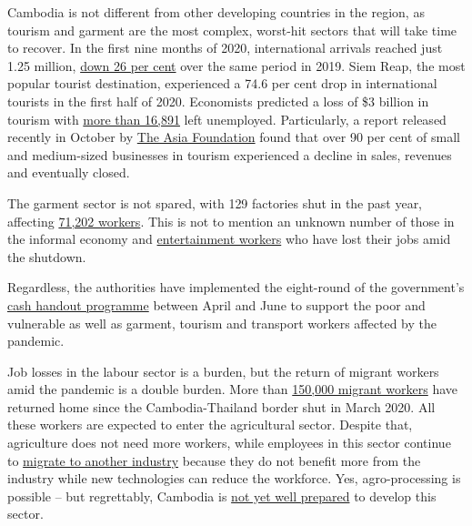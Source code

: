 \documentclass[10pt,a4paper]{letter}
\begin{document}
Cambodia is not different from other developing countries in the region, as tourism and garment are the most complex, worst-hit sectors that will take time to recover. In the first nine months of 2020, international arrivals reached just 1.25 million, \href{http://documents1.worldbank.org/curated/en/986491608013945613/pdf/Cambodia-Economic-Update-Restrained-Recovery-Special-Focus-Adapting-to-COVID-19-in-an-Uncertain-World.pdf}{down 26 per cent} over the same period in 2019. Siem Reap, the most popular tourist destination, experienced a 74.6 per cent drop in international tourists in the first half of 2020. Economists predicted a loss of \$3 billion in tourism with \href{http://www.xinhuanet.com/english/2020-06/01/c_139105722.htm}{more than 16,891} left unemployed. Particularly, a report released recently in October by \href{https://asiafoundation.org/publication/enduring-the-pandemic-rapid-survey-on-the-impact-of-covid-19-on-msmes-in-the-tourism-sector-and-households-in-cambodia/}{The Asia Foundation} found that over 90 per cent of small and medium-sized businesses in tourism experienced a decline in sales, revenues and eventually closed.

The garment sector is not spared, with 129 factories shut in the past year, affecting \href{https://www.phnompenhpost.com/business/chinese-propose-20-garment-footwear-factories-kampong-speu}{71,202 workers}. This is not to mention an unknown number of those in the informal economy and \href{https://vodenglish.news/opinion-covid-19-pandemic-supports-case-for-decriminalizing-sex-work/}{entertainment workers} who have lost their jobs amid the shutdown.

Regardless, the authorities have implemented the eight-round of the government's \href{https://www.facebook.com/CAMNSPC/posts/778279929460700}{cash handout programme} between April and June to support the poor and vulnerable as well as garment, tourism and transport workers affected by the pandemic.

Job losses in the labour sector is a burden, but the return of migrant workers amid the pandemic is a double burden. More than \href{https://www.reuters.com/article/us-cambodia-thailand-migrants-feature-tr-idUSKBN2AQ03B}{150,000 migrant workers} have returned home since the Cambodia-Thailand border shut in March 2020. All these workers are expected to enter the agricultural sector. Despite that, agriculture does not need more workers, while employees in this sector continue to \href{https://southeastasiaglobe.com/cambodias-agricultural-sector-is-one-in-dire-need-of-revitalising}{migrate to another industry} because they do not benefit more from the industry while new technologies can reduce the workforce. Yes, agro-processing is possible -- but regrettably, Cambodia is \href{https://www.phnompenhpost.com/opinion/kingdoms-agro-processing-potential}{not yet well prepared} to develop this sector.
\end{document}
